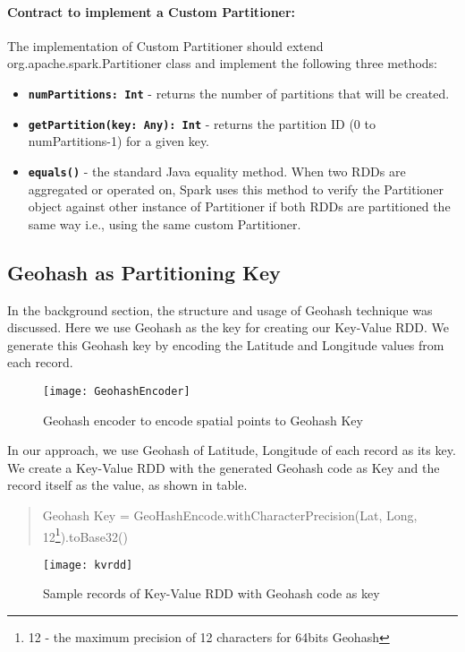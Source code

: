 \documentclass[article,type=msc,colorback,10pt,accentcolor=tud1d]{tudthesis}
\begin{document}
		\paragraph{	Contract to implement a Custom Partitioner: }
			The implementation of Custom Partitioner should extend org.apache.spark.Partitioner class and implement the following three methods:\cite{sparkbook}
			
			\begin{itemize}
				\item \textbf{\texttt{numPartitions: Int}} - returns the number of partitions that will be created.
				\item \textbf{\texttt{getPartition(key: Any): Int}} - returns the partition ID (0 to numPartitions-1) for a given key.
				\item \textbf{\texttt{equals()}} - the standard Java equality method. When two RDDs are aggregated or operated on, Spark uses this method to verify the Partitioner object against other instance of Partitioner if both RDDs are partitioned the same way i.e., using the same custom Partitioner.
			\end{itemize}
			
		\subsection{Geohash as Partitioning Key}
			\par In the background section, the structure and usage of Geohash technique was discussed. Here we use Geohash as the key for creating our Key-Value RDD. We generate this Geohash key by encoding the Latitude and Longitude values from each record. \\
						
				\begin{figure}[h]
					\centering
					\texttt{[image: GeohashEncoder]}
					\caption{Geohash encoder to encode spatial points to Geohash Key}
					\label{fig:GeohashEncoder}
				\end{figure}
		In our approach, we use Geohash of Latitude, Longitude of each record as its key. We create a Key-Value RDD with the generated Geohash code as Key and the record itself as the value, as shown in table. 
		\begin{quote}
			Geohash Key = GeoHashEncode.withCharacterPrecision(Lat, Long, 12\footnote{12 - the  maximum precision of 12 characters for 64bits Geohash}).toBase32()
		\end{quote}
				\begin{figure}[h]
					\centering
					\texttt{[image: kvrdd]}
					\caption{Sample records of Key-Value RDD with Geohash code as key}
					\label{fig:kvrdd}
				\end{figure}
				
\end{document}
